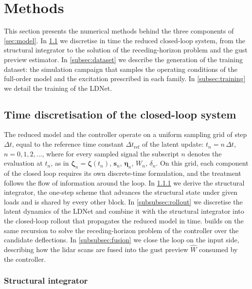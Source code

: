\section{Methods}
\label{sec:methods}

This section presents the numerical methods behind the three components of \cref{sec:model}. In \cref{subsec:discretisation} we discretise in time the reduced closed-loop system, from the structural integrator to the solution of the receding-horizon problem and the gust preview estimator. In \cref{subsec:dataset} we describe the generation of the training dataset: the simulation campaign that samples the operating conditions of the full-order model  and the excitation prescribed in each family. In \cref{subsec:training} we detail the training of the LDNet.

\subsection{Time discretisation of the closed-loop system}
\label{subsec:discretisation}

The reduced model  and the controller operate on a uniform sampling grid of step $\Delta t$, equal to the reference time constant $\Delta t_\mathrm{ref}$ of the latent update: $t_n = n\,\Delta t$, $n = 0, 1, 2, \dots$, where for every sampled signal the subscript $n$ denotes the evaluation at $t_n$, as in $\boldsymbol{\zeta}_n = \boldsymbol{\zeta}(t_n)$, $\mathbf{s}_n$, $\boldsymbol{\eta}_n$, $W_n$, $\delta_n$. On this grid, each component of the closed loop requires its own discrete-time formulation, and the treatment follows the flow of information around the loop. In \cref{subsubsec:integrator} we derive the structural integrator, the one-step scheme that advances the structural state under given loads and is shared by every other block. In \cref{subsubsec:rollout} we discretise the latent dynamics of the LDNet and combine it with the structural integrator into the closed-loop rollout that propagates the reduced model in time.  builds on the same recursion to solve the receding-horizon problem of the controller over the candidate deflections. In \cref{subsubsec:fusion} we close the loop on the input side, describing how the lidar scans are fused into the gust preview $\widehat{W}$ consumed by the controller.

\subsubsection{Structural integrator}
\label{subsubsec:integrator}

